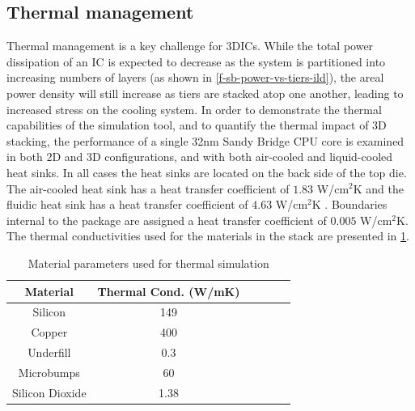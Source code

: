 \documentclass[journal,twoside]{IEEEtran}
\newcommand{\changed}[1]{\textcolor{red}{#1}}
\newcommand{\rechanged}[1]{\textcolor{red}{#1}}
\newcommand{\rerechanged}[1]{\textcolor{red}{#1}}
\renewcommand{\rechanged}[1]{#1} %
\renewcommand{\changed}[1]{#1} %
\renewcommand{\rerechanged}[1]{#1} %
\begin{document}
\subsection{Thermal management} \label{s-3D-thermal}
Thermal management is a key challenge for 3DICs.
While the total power dissipation of an IC is expected to decrease as the system is partitioned into increasing numbers of layers 
(as shown in \cref{f-sb-power-vs-tiers-ild}),
the areal power density will still increase as tiers are stacked atop one another,
leading to increased stress on the cooling system.
In order \rerechanged{to demonstrate the thermal capabilities of the simulation tool, and} to quantify the thermal impact of 3D stacking, the performance of a single 32nm Sandy Bridge CPU core is examined 
\changed{in both 2D and 3D configurations, and with both air-cooled and \rechanged{liquid-cooled} heat sinks. 
\rechanged{In all cases the heat sinks are located on the back side of the top die.}
The air-cooled heat sink has a heat transfer coefficient of $1.83$ W/cm$^2$K and the fluidic heat sink
has a heat transfer coefficient of $4.63$ W/cm$^2$K \cite{zhang-micropinfin-heat-sink-2013}.
Boundaries internal to the package are assigned a heat transfer coefficient of $0.005$ W/cm$^2$K. The
thermal conductivities used for the materials in the stack are presented in \cref{t-thermal-materials}.}

\begin{table}[tb]
	\centering
	\caption{Material parameters used for thermal simulation}
	\begin{tabular}{cccccl}
		\hline
		Material		 & Thermal Cond. (W/mK) \\
		\hline
		\hline
		Silicon			&	149 \\
		Copper			&	400 \\
		Underfill		&	0.3 \\
		Microbumps		&	60	\\
		Silicon Dioxide	&	1.38 \\
		\hline
	\end{tabular}
	\label{t-thermal-materials}	
\end{table}
\end{document}
